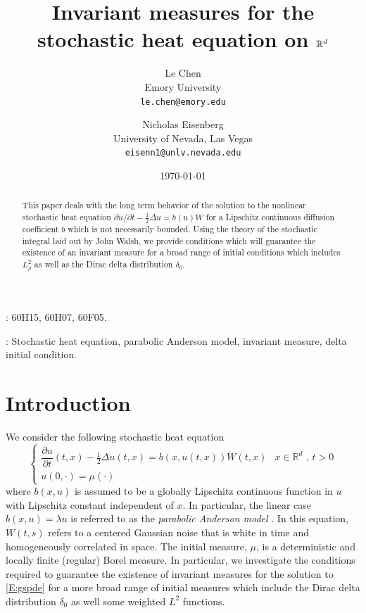 \documentclass[a4paper,11pt]{article}
\title{Invariant measures for the stochastic heat equation on $\R^d$}
\author{Le Chen\\Emory University\\\texttt{le.chen@emory.edu}\\
	\and
		Nicholas Eisenberg\\University of Nevada, Las Vegas\\\texttt{eisenn1@unlv.nevada.edu}
	}
\date{\today}
\numberwithin{equation}{section}
\theoremstyle{plain}
\theoremstyle{definition}
\newcommand{\R}{\mathbb{R}}
\begin{document}
\maketitle

\begin{abstract}
	This paper deals with the long term behavior of the solution to the nonlinear stochastic heat equation 
	$\partial u /\partial t - \frac{1}{2}\Delta u= b(u)\dot{W}$ for a Lipschitz continuous diffusion coefficient 
	$b$ which is not necessarily bounded. Using the theory of the stochastic integral laid out by John Walsh, 
	we provide conditions which will guarantee the existence of an invariant measure for a broad range of initial 
	conditions which includes $L^2_\rho$ as well as the Dirac delta distribution $\delta_0$. 
\end{abstract}

\bigskip

: 60H15, 60H07, 60F05.
 \smallskip

: Stochastic heat equation, parabolic Anderson model, invariant measure, delta initial condition. 
\smallskip
	



\section{Introduction} 
We consider the following stochastic heat equation 
\begin{equation}
	\begin{cases}
	\dfrac{\partial u}{\partial t}(t,x)-\frac{1}{2}\Delta u(t,x) = b(x,u(t,x))\dot W(t,x) & \text{$x\in \R^d$ , $t>0$} \\
	u(0,\cdot) = \mu(\cdot)  & 
	\end{cases}  \label{E:gspde}
\end{equation} 
where $b(x,u)$ is assumed to be a globally Lipschitz continuous function in $u$ with Lipschitz constant independent of $x$.
In particular, the linear case  $b(x,u) = \lambda u$ is referred to as the \textit{parabolic Anderson model} \cite{CarMol94}.
In this equation, $\dot{W}(t,s)$ refers to a centered Gaussian noise that is white in time and homogeneously correlated in space.
The initial measure, $\mu$, is a deterministic and locally finite (regular) Borel measure. 
In particular, we investigate the conditions required to guarantee the existence of invariant measures 
for the solution to \eqref{E:gspde} for a more broad range of initial measures which include the Dirac delta
distribution $\delta_0$ as well some weighted $L^2$ functions.
\end{document}
